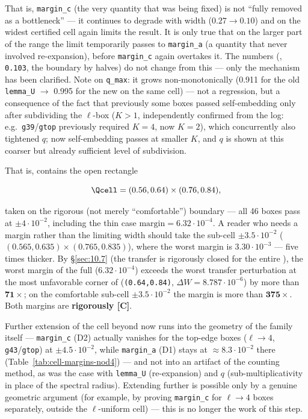 That is, \texttt{margin\_c} (the very quantity that was being fixed) is not ``fully
removed as a bottleneck'' --- it continues to degrade with width ($0.27\to 0.10$) and
on the widest certified cell \Qcell{} again limits the result.
It is only true that on the larger part of the range the limit temporarily passes
to \texttt{margin\_a} (a quantity that never involved re-expansion), before \texttt{margin\_c}
again overtakes it. The numbers (\Qcell, \texttt{0.103}, the boundary by halves) do
not change from this --- only the mechanism has been clarified. Note on
\texttt{q\_max}: it grows non-monotonically (0.911 for the old \texttt{lemma\_U} $\to$ 0.995 for
the new on the same cell) --- not a regression, but a consequence of the fact
that previously some boxes passed self-embedding only after subdividing the
$\ell$-box ($K > 1$, independently confirmed from the log: e.g.\ \texttt{g39}/\texttt{gtop}
previously required $K=4$, now $K=2$), which concurrently also tightened
$q$; now self-embedding passes at smaller $K$, and $q$ is shown at this
coarser but already sufficient level of subdivision.

That is, \Ffam{} contains the open rectangle

\[
\Qcell = (0.56, 0.64) \times (0.76, 0.84) ,
\]

taken on the rigorous (not merely ``comfortable'') boundary --- all 46 boxes pass
at $\pm 4\cdot 10^{-2}$, including the thin case $\mathrm{margin} = 6.32\cdot 10^{-4}$. A reader who needs
a margin rather than the limiting width should take the sub-cell $\pm 3.5\cdot 10^{-2}$
($(0.565,0.635)\times(0.765,0.835)$), where the worst margin is $3.30\cdot 10^{-3}$ --- five times
thicker. By \S\ref{sec:10.7} (the transfer is rigorously closed for the entire \Qcell),
the worst margin of the full \Qcell{} ($6.32\cdot 10^{-4}$) exceeds the worst
transfer perturbation at the most unfavorable corner of \Qcell{} (\texttt{(0.64,0.84)},
$\Delta W = 8.787\cdot 10^{-6}$) by more than $\mathbf{71\times}$; on the comfortable sub-cell $\pm 3.5\cdot 10^{-2}$
the margin is more than $\mathbf{375\times}$. Both margins are \textbf{rigorously [C]}.

Further extension of the cell beyond \Qcell{} now runs into the geometry
of the family itself --- \texttt{margin\_c} (D2) actually vanishes for the
top-edge boxes ($\ell \to 4$, \texttt{g43}/\texttt{gtop}) at $\pm 4.5\cdot 10^{-2}$, while
\texttt{margin\_a} (D1) stays at $\approx 8.3\cdot 10^{-2}$ there
(Table~\ref{tab:cell-margins-nod4}) --- and not
into an artifact of the counting method, as was the case with \texttt{lemma\_U} (re-expansion)
and $q$ (sub-multiplicativity in place of the spectral radius). Extending \Qcell{} further
is possible only by a genuine geometric argument (for example, by proving \texttt{margin\_c}
for $\ell \to 4$ boxes separately, outside the $\ell$-uniform cell) --- this is no longer the
work of this step.

